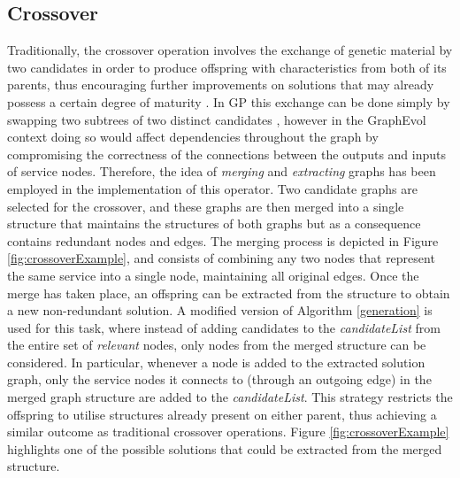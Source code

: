 \documentclass{article}
\begin{document}
\subsection{Crossover}
Traditionally, the crossover operation involves the exchange of genetic material by two candidates in order to produce
offspring with characteristics from both of its parents, thus encouraging further improvements on solutions that may already
possess a certain degree of maturity \cite{qi1994theoretical}. In GP this exchange can be done simply by swapping two subtrees
of two distinct candidates \cite{aversano2006genetic}, however in the GraphEvol context doing so would affect dependencies
throughout the graph by compromising the correctness of the connections between the outputs and inputs of service nodes. Therefore,
the idea of \textit{merging} and \textit{extracting} graphs has been employed in the implementation of this operator. Two candidate
graphs are selected for the crossover, and these graphs are then merged into a single structure that maintains the structures of
both graphs but as a consequence contains redundant nodes and edges. The merging process is depicted in Figure \ref{fig:crossoverExample},
and consists of combining any two nodes that represent the same service into a single node, maintaining all original edges. Once the merge has
taken place, an offspring can be extracted from the structure to obtain a new non-redundant solution. A modified version of Algorithm
\ref{generation} is used for this task, where instead of adding candidates to the \textit{candidateList} from the entire set of
\textit{relevant} nodes, only nodes from the merged structure can be considered. In particular, whenever a node is added to the extracted
solution graph, only the service nodes it connects to (through an outgoing edge) in the merged graph structure are added to the
\textit{candidateList}. This strategy restricts the offspring to utilise structures already present on either parent, thus achieving
a similar outcome as traditional crossover operations. Figure \ref{fig:crossoverExample} highlights one of the possible solutions that
could be extracted from the merged structure.
\end{document}
